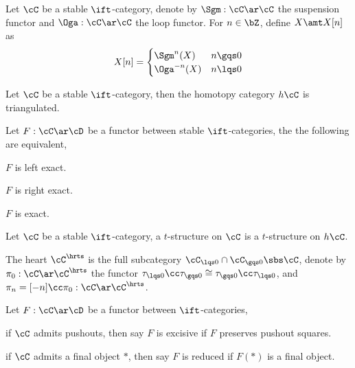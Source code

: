 \documentclass[article, a4paper, twoside]{universal}
\begin{document}
\begin{dfn}[1.1.2.7]
    Let $\cC$ be a stable $\ift$-category, denote by $\Sgm:\cC\ar\cC$ the suspension functor and $\Oga:\cC\ar\cC$ the loop functor. For $n\in\bZ$, define $X\amt X[n]$ as
        \[
            X[n]=\begin{cases}
              \Sgm^{n}(X) & n\gqs0 \\
              \Oga^{-n}(X) & n\lqs0
            \end{cases}
        \]
\end{dfn}

\begin{thm}[1.1.2.14]

    Let $\cC$ be a stable $\ift$-category, then the homotopy category $h\cC$ is triangulated.

\end{thm}

\begin{thm}[1.1.4.1]
    Let $F:\cC\ar\cD$ be a functor between stable $\ift$-categories, the the following are equivalent,
    \begin{enr}[label=(\arabic*)]
        \item $F$ is left exact.
        \item $F$ is right exact.
        \item $F$ is exact.
    \end{enr}
\end{thm}



\begin{dfn}[1.2.1.4, 1.2.1.11]
    Let $\cC$ be a stable $\ift$-category, a $t$-structure on $\cC$ is a $t$-structure on $h\cC$.

    The heart $\cC^{\hrts}$ is the full subcategory $\cC_{\lqs0}\cap\cC_{\gqs0}\sbs\cC$, denote by $\pi_{0}:\cC\ar\cC^{\hrts}$ the functor $\tau_{\lqs0}\cc\tau_{\gqs0}\cong\tau_{\gqs0}\cc\tau_{\lqs0}$, and $\pi_{n}=[-n]\cc\pi_{0}:\cC\ar\cC^{\hrts}$.
\end{dfn}




\begin{dfn}[1.4.2.1]
    Let $F:\cC\ar\cD$ be a functor between $\ift$-categories,
    \begin{enr}[label=(\arabic*)]
        \item if $\cC$ admits pushouts, then say $F$ is excisive if $F$ preserves pushout squares.
        \item if $\cC$ admits a final object $*$, then say $F$ is reduced if $F(*)$ is a final object.
    \end{enr}
\end{dfn}
\end{document}
